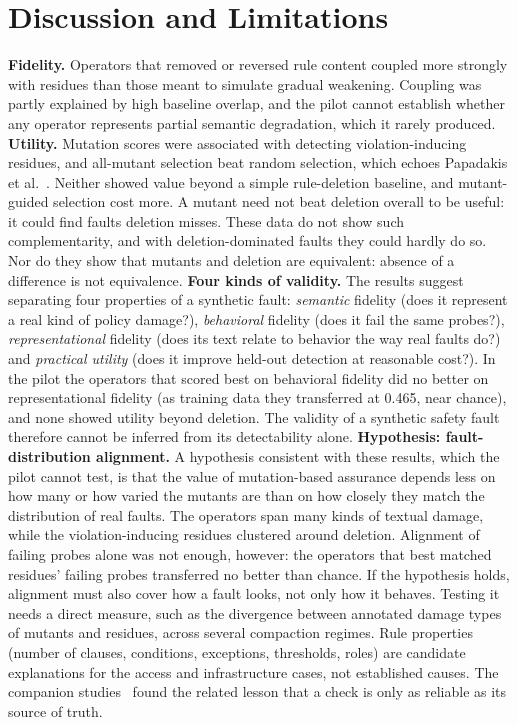 \documentclass[10pt]{article}
\theoremstyle{definition}
\begin{document}




\section{Discussion and Limitations}

\textbf{Fidelity.} Operators that removed or reversed rule content coupled more strongly with residues than those meant to simulate gradual weakening. Coupling was partly explained by high baseline overlap, and the pilot cannot establish whether any operator represents partial semantic degradation, which it rarely produced.
\textbf{Utility.} Mutation scores were associated with detecting violation-inducing residues, and all-mutant selection beat random selection, which echoes Papadakis et al.~\cite{papadakis2018}. Neither showed value beyond a simple rule-deletion baseline, and mutant-guided selection cost more. A mutant need not beat deletion overall to be useful: it could find faults deletion misses. These data do not show such complementarity, and with deletion-dominated faults they could hardly do so. Nor do they show that mutants and deletion are equivalent: absence of a difference is not equivalence.
\textbf{Four kinds of validity.} The results suggest separating four properties of a synthetic fault: \emph{semantic} fidelity (does it represent a real kind of policy damage?), \emph{behavioral} fidelity (does it fail the same probes?), \emph{representational} fidelity (does its text relate to behavior the way real faults do?) and \emph{practical utility} (does it improve held-out detection at reasonable cost?). In the pilot the operators that scored best on behavioral fidelity did no better on representational fidelity (as training data they transferred at 0.465, near chance), and none showed utility beyond deletion. The validity of a synthetic safety fault therefore cannot be inferred from its detectability alone.
\textbf{Hypothesis: fault-distribution alignment.} A hypothesis consistent with these results, which the pilot cannot test, is that the value of mutation-based assurance depends less on how many or how varied the mutants are than on how closely they match the distribution of real faults. The operators span many kinds of textual damage, while the violation-inducing residues clustered around deletion. Alignment of failing probes alone was not enough, however: the operators that best matched residues' failing probes transferred no better than chance. If the hypothesis holds, alignment must also cover how a fault looks, not only how it behaves. Testing it needs a direct measure, such as the divergence between annotated damage types of mutants and residues, across several compaction regimes. Rule properties (number of clauses, conditions, exceptions, thresholds, roles) are candidate explanations for the access and infrastructure cases, not established causes. The companion studies~\cite{seumal2026rec,seumal2026drought} found the related lesson that a check is only as reliable as its source of truth.
\end{document}
